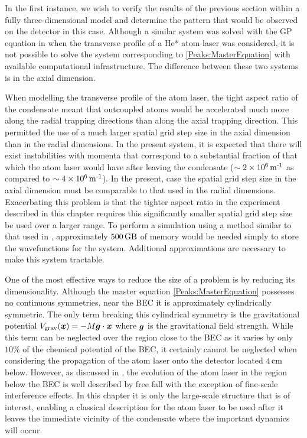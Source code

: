 In the first instance, we wish to verify the results of the previous section within a fully three-dimensional model and determine the pattern that would be observed on the detector in this case. Although a similar system was solved with the GP equation in  when the transverse profile of a He* atom laser was considered, it is not possible to solve the system corresponding to \eqref{Peaks:MasterEquation} with available computational infrastructure. The difference between these two systems is in the axial dimension.

When modelling the transverse profile of the atom laser, the tight aspect ratio of the condensate meant that outcoupled atoms would be accelerated much more along the radial trapping directions than along the axial trapping direction. This permitted the use of a much larger spatial grid step size in the axial dimension than in the radial dimensions. In the present system, it is expected that there will exist instabilities with momenta that correspond to a substantial fraction of that which the atom laser would have after leaving the condensate ($\sim \unit[2 \times 10^6]{m\textsuperscript{-1}}$ as compared to $\sim \unit[4 \times 10^6]{m\textsuperscript{-1}}$). In the present, case the spatial grid step size in the axial dimension must be comparable to that used in the radial dimensions. Exacerbating this problem is that the tighter aspect ratio in the experiment described in this chapter requires this significantly smaller spatial grid step size be used over a larger range. To perform a simulation using a method similar to that used in , approximately $\unit[500]{GB}$ of memory would be needed simply to store the wavefunctions for the system. Additional approximations are necessary to make this system tractable.

One of the most effective ways to reduce the size of a problem is by reducing its dimensionality. Although the master equation \eqref{Peaks:MasterEquation} possesses no continuous symmetries, near the BEC it is approximately cylindrically symmetric. The only term breaking this cylindrical symmetry is the gravitational potential $V_\text{grav}(\bm{x}) =- M \bm{g} \cdot \bm{x}$ where $\bm{g}$ is the gravitational field strength. While this term can be neglected over the region close to the BEC as it varies by only $10\%$ of the chemical potential of the BEC, it certainly cannot be neglected when considering the propagation of the atom laser onto the detector located $\unit[4]{cm}$ below. However, as discussed in , the evolution of the atom laser in the region below the BEC is well described by free fall with the exception of fine-scale interference effects. In this chapter it is only the large-scale structure that is of interest, enabling a classical description for the atom laser to be used after it leaves the immediate vicinity of the condensate where the important dynamics will occur.

